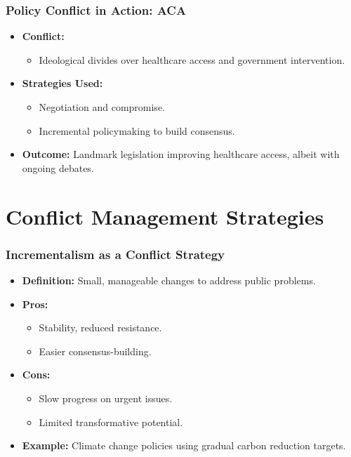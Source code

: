 \documentclass[10pt]{beamer}
\begin{document}
        \begin{frame}
        \frametitle{Policy Conflict in Action: ACA}
        \begin{itemize}
            \item \textbf{Conflict:}
                \begin{itemize}
                    \item Ideological divides over healthcare access and government intervention.
                \end{itemize}
            \item \textbf{Strategies Used:}
                \begin{itemize}
                    \item Negotiation and compromise.
                    \item Incremental policymaking to build consensus.
                \end{itemize}
            \item \textbf{Outcome:} Landmark legislation improving healthcare access, albeit with ongoing debates.
        \end{itemize}
        \end{frame}

        \section{Conflict Management Strategies}
        
        \begin{frame}
        \frametitle{Incrementalism as a Conflict Strategy}
        \begin{itemize}
            \item \textbf{Definition:} Small, manageable changes to address public problems.
            \item \textbf{Pros:}
                \begin{itemize}
                    \item Stability, reduced resistance.
                    \item Easier consensus-building.
                \end{itemize}
            \item \textbf{Cons:}
                \begin{itemize}
                    \item Slow progress on urgent issues.
                    \item Limited transformative potential.
                \end{itemize}
            \item \textbf{Example:} Climate change policies using gradual carbon reduction targets.
        \end{itemize}
        \end{frame}
\end{document}
